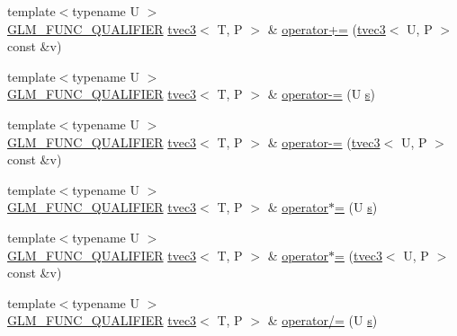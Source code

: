 \begin{DoxyCompactItemize}
\item 
{\footnotesize template$<$typename U $>$ }\\\hyperlink{setup_8hpp_a33fdea6f91c5f834105f7415e2a64407}{G\+L\+M\+\_\+\+F\+U\+N\+C\+\_\+\+Q\+U\+A\+L\+I\+F\+I\+ER} \hyperlink{structglm_1_1detail_1_1tvec3}{tvec3}$<$ T, P $>$ \& \hyperlink{structglm_1_1detail_1_1tvec3_af459080608fac7a3cf88684d44b10fc3}{operator+=} (\hyperlink{structglm_1_1detail_1_1tvec3}{tvec3}$<$ U, P $>$ const \&v)
\item 
{\footnotesize template$<$typename U $>$ }\\\hyperlink{setup_8hpp_a33fdea6f91c5f834105f7415e2a64407}{G\+L\+M\+\_\+\+F\+U\+N\+C\+\_\+\+Q\+U\+A\+L\+I\+F\+I\+ER} \hyperlink{structglm_1_1detail_1_1tvec3}{tvec3}$<$ T, P $>$ \& \hyperlink{structglm_1_1detail_1_1tvec3_aaffa97a8d1d5dd29ba438159fb60e0e9}{operator-\/=} (U \hyperlink{structglm_1_1detail_1_1tvec3_aa7906d8cd1a54c96ba22c1f97ebaf7cc}{s})
\item 
{\footnotesize template$<$typename U $>$ }\\\hyperlink{setup_8hpp_a33fdea6f91c5f834105f7415e2a64407}{G\+L\+M\+\_\+\+F\+U\+N\+C\+\_\+\+Q\+U\+A\+L\+I\+F\+I\+ER} \hyperlink{structglm_1_1detail_1_1tvec3}{tvec3}$<$ T, P $>$ \& \hyperlink{structglm_1_1detail_1_1tvec3_a74d551954eaca6824359af0d741a17df}{operator-\/=} (\hyperlink{structglm_1_1detail_1_1tvec3}{tvec3}$<$ U, P $>$ const \&v)
\item 
{\footnotesize template$<$typename U $>$ }\\\hyperlink{setup_8hpp_a33fdea6f91c5f834105f7415e2a64407}{G\+L\+M\+\_\+\+F\+U\+N\+C\+\_\+\+Q\+U\+A\+L\+I\+F\+I\+ER} \hyperlink{structglm_1_1detail_1_1tvec3}{tvec3}$<$ T, P $>$ \& \hyperlink{structglm_1_1detail_1_1tvec3_a519058bf101092a6e09727980443a2bc}{operator$\ast$=} (U \hyperlink{structglm_1_1detail_1_1tvec3_aa7906d8cd1a54c96ba22c1f97ebaf7cc}{s})
\item 
{\footnotesize template$<$typename U $>$ }\\\hyperlink{setup_8hpp_a33fdea6f91c5f834105f7415e2a64407}{G\+L\+M\+\_\+\+F\+U\+N\+C\+\_\+\+Q\+U\+A\+L\+I\+F\+I\+ER} \hyperlink{structglm_1_1detail_1_1tvec3}{tvec3}$<$ T, P $>$ \& \hyperlink{structglm_1_1detail_1_1tvec3_a1d2ab1093230a4404781d65564e4f7d0}{operator$\ast$=} (\hyperlink{structglm_1_1detail_1_1tvec3}{tvec3}$<$ U, P $>$ const \&v)
\item 
{\footnotesize template$<$typename U $>$ }\\\hyperlink{setup_8hpp_a33fdea6f91c5f834105f7415e2a64407}{G\+L\+M\+\_\+\+F\+U\+N\+C\+\_\+\+Q\+U\+A\+L\+I\+F\+I\+ER} \hyperlink{structglm_1_1detail_1_1tvec3}{tvec3}$<$ T, P $>$ \& \hyperlink{structglm_1_1detail_1_1tvec3_af3e883a1150dc47126e797bd912c20a4}{operator/=} (U \hyperlink{structglm_1_1detail_1_1tvec3_aa7906d8cd1a54c96ba22c1f97ebaf7cc}{s})

\end{DoxyCompactItemize}
